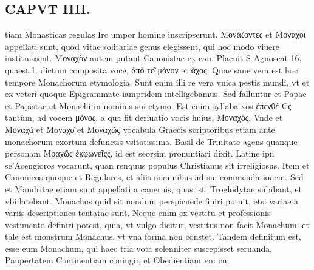 \documentclass{article}
\begin{document}
\begin{pages}
\section*{CAPVT  IIII. }
\marginpar{[ p.213 ]}\pstart tiam Monasticas regulas Irc umpor homine inscripserunt.  \pend\pstart Μονάζοντες et Μοναχοι appellati sunt, quod vitae solitariae genus elegissent, qui hoc modo viuere instituissent. Μοναχὸν autem putant Canonistae ex can. Placuit S Agnoscat 16. quaest.1. dictum composita voce, ἀπὸ το͂ μόνον et ἄχος. Quae sane vera est hoc tempore Monachorum etymologia. Sunt enim illi re vera vnica pestis mundi, vt et ex veteri quoque Epigrammate iampridem intelligebamus. Sed falluntur et Papae et Papistae et Monachi in nominis sui etymo. Est enim syllaba xos ἐπενθέ Cς tantùm, ad vocem μόνος, a qua fit deriuatio vocis huius, Μοναχὸς. Vnde et Μοναχᾶ et Moναχο͂ et Μοναχῶς vocabula Graecis scriptoribus etiam ante monachorum exortum defunctis vsitatissima. Basil de Trinitate agens quanque  personam Μοαχῶς ἐκφωνεῖςς, id est seorsim pronuntiari dixit. Latine ipn se’Acengioros vocarunt, quan renquus populus Christianus sit irreligiosus. Item et Canonicos quoque et Regulares, et aliis nominibus ad sui commendationem. Sed et Mandritae etiam sunt appellati a cauernis, quas isti Troglodytae subibant, et vbi latebant.  \pend\pstart Monachus quid sit nondum perspicuede finiri potuit, etsi variae a variis descriptiones tentatae sunt. Neque enim ex vestitu et professionis vestimento definiri potest, quia, vt vulgo dicitur, vestitus non facit Monachum: et tale est monstrum Monachus, vt vna forma non constet. Tandem definitum est, esse eum Monachum, qui haec tria vota solenniter suscepisset seruanda, Paupertatem Continentiam coniugii, et Obedientiam vni cui  \pend

\end{pages}
\end{document}

